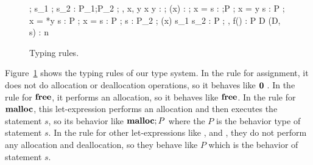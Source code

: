 \begin{figure}[tp]
\begin{minipage}{\textwidth}


{\Theta ; \Gamma \vdash s_{1} ; s_{2} : P_{1};P_{2} }
\infax[T-Assign]
{\Theta ; \Gamma, x, y \vdash *x \leftarrow y :  }
{\Theta ; \Gamma \vdash \Free(x) : \Free}
{\Theta ; \Gamma \vdash \LET x = \MALLOC \; \IN s  : \Malloc;P}
{\Theta ; \Gamma \vdash \LET x = y \; \IN s : P}
{\Theta ; \Gamma \vdash \LET x = *y \; \IN s : P}
{\Theta ; \Gamma \vdash \LET x =  \; \IN s : P}
{\Theta ; \Gamma \vdash s : P_{2}}
{\Theta ; \Gamma \vdash \IFNULL(x) \; \THEN s_{1}\; \ELSE s_{2} : P}
{\Theta; \Gamma,  \vdash f() : P}
{\vdash D \COL \Theta}
{\vdash (D, s) : n}

\end{minipage}
\caption{Typing rules.}
\label{fig:typingrules}
\end{figure}

Figure~\ref{fig:typingrules} shows the typing rules of our type
system. In the rule for assignment, it does not do allocation or
deallocation operations, so it behaves like \(\bf 0\) . In the rule
for \(\mathbf{free}\), it performs an allocation, so it behaves like
\(\mathbf{free}\).  In the rule for \(\mathbf{malloc}\), this let-expression performs
an allocation and then executes the statement \(s\), so its behavior
like \(\mathbf{malloc};P\) where the \(P\) is the behavior type of statement
\(s\). In the rule for other let-expressions like ,
 and , they do not perform any
allocation and deallocation, so they behave like \(P\) which is the
behavior of statement \(s\).

